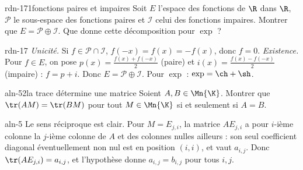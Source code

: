 \begin{exo}{rdn-17}{1}{fonctions paires et impaires}
Soit $E$ l'espace des fonctions de $\R$ dans $\R$, $\mathcal P$ le sous-espace des fonctions paires et $\mathcal I$ celui des
fonctions impaires. Montrer que $E=\mathcal P\oplus\mathcal I$. Que donne cette décomposition pour $\exp$ ?
\end{exo}
\begin{corrige}{rdn-17}
\emph{Unicité.} Si $f\in\mathcal P\cap\mathcal I$, $f(-x)=f(x)=-f(x)$, donc $f=0$. \emph{Existence.} Pour $f\in E$, on pose
$p(x)=\frac{f(x)+f(-x)}2$ (paire) et $i(x)=\frac{f(x)-f(-x)}2$ (impaire) : $f=p+i$. Donc $E=\mathcal P\oplus\mathcal I$.
Pour $\exp$ : $\exp=\ch+\sh$.
\end{corrige}

\begin{exo}{aln-5}{2}{la trace détermine une matrice}
Soient $A,B\in\Mn{\K}$. Montrer que $\tr(AM)=\tr(BM)$ pour tout $M\in\Mn{\K}$ si et seulement si $A=B$.
\end{exo}
\begin{corrige}{aln-5}
Le sens réciproque est clair. Pour $M=E_{j,i}$, la matrice $AE_{j,i}$ a pour $i$-ième colonne la $j$-ième colonne de $A$ et des
colonnes nulles ailleurs : son seul coefficient diagonal éventuellement non nul est en position $(i,i)$, et vaut $a_{i,j}$. Donc
$\tr(AE_{j,i})=a_{i,j}$, et l'hypothèse donne $a_{i,j}=b_{i,j}$ pour tous $i,j$.
\end{corrige}

